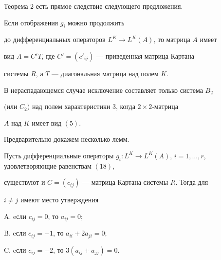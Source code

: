 Теорема 2 есть прямое следствие следующего предложения.





\begin{prop}


Если отображения $g_i$ можно продолжить


до дифференциальных операторов $L^K\to L^K(A)$, то матрица $A$ имеет


вид $A=C'T$, где $C'=(c'_{ij})$ --- приведенная матрица Картана


системы $R$, а $T$ --- диагональная матрица над полем $K$.


В нераспадающемся случае исключение составляет только система $B_2$


$($или $C_2)$ над полем характеристики $3$, когда $2\times 2$-матрица


$A$ над $K$ имеет вид $(5)$.


\end{prop}





Предварительно докажем несколько лемм.





\begin{lem}


Пусть дифференциальные операторы $g_i:


L^K\to L^K(A)$, $i=1,\dotsc,r$, удовлетворяющие равенствам $(18)$,


существуют и $C=(c_{ij})$ --- матрица Картана системы $R$. Тогда для


$i\ne j$ имеют место утверждения





$\mathrm A$. eсли $c_{ij}=0$, то $a_{ij}=0;$





$\mathrm B$. eсли $c_{ij}=-1$, то $a_{ii}+2a_{ji}=0;$





$\mathrm C$. eсли $c_{ij}=-2$, то $3(a_{ij}+a_{jj})=0$.


\end{lem}





